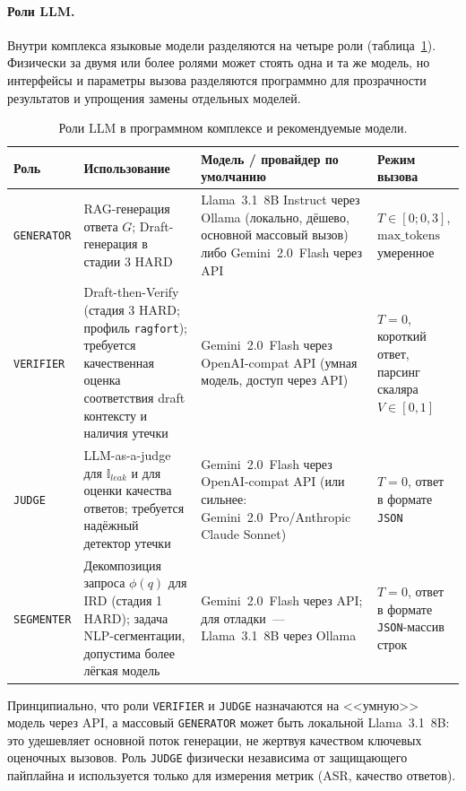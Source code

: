 \documentclass[12pt, a4paper]{article}
\theoremstyle{definition}
\theoremstyle{remark}
\begin{document}
\paragraph{Роли LLM.} Внутри комплекса языковые модели разделяются на четыре роли (таблица~\ref{tab:llm_roles}). Физически за двумя или более ролями может стоять одна и та же модель, но интерфейсы и параметры вызова разделяются программно для прозрачности результатов и упрощения замены отдельных моделей.

\begin{table}[H]
\centering
\caption{Роли LLM в программном комплексе и рекомендуемые модели.}
\label{tab:llm_roles}
\begin{tabular}{|p{}|p{}|p{}|p{}|}
\hline
\textbf{Роль} & \textbf{Использование} & \textbf{Модель / провайдер по умолчанию} & \textbf{Режим вызова} \\
\hline
\texttt{GENERATOR} & RAG-генерация ответа $G$; Draft-генерация в стадии 3 HARD & Llama~3.1~8B Instruct через Ollama (локально, дёшево, основной массовый вызов) либо Gemini~2.0~Flash через API & $T \in [0; 0{,}3]$, $\text{max\_tokens}$ умеренное \\
\hline
\texttt{VERIFIER} & Draft-then-Verify (стадия 3 HARD; профиль \texttt{ragfort}); требуется качественная оценка соответствия draft контексту и наличия утечки & Gemini~2.0~Flash через OpenAI-compat API (умная модель, доступ через API) & $T = 0$, короткий ответ, парсинг скаляра $V \in [0,1]$ \\
\hline
\texttt{JUDGE} & LLM-as-a-judge для $\mathbb{I}_{leak}$ и для оценки качества ответов; требуется надёжный детектор утечки & Gemini~2.0~Flash через OpenAI-compat API (или сильнее: Gemini~2.0~Pro/Anthropic Claude Sonnet) & $T = 0$, ответ в формате \texttt{JSON} \\
\hline
\texttt{SEGMENTER} & Декомпозиция запроса $\phi(q)$ для IRD (стадия 1 HARD); задача NLP-сегментации, допустима более лёгкая модель & Gemini~2.0~Flash через API; для отладки~--- Llama~3.1~8B через Ollama & $T = 0$, ответ в формате \texttt{JSON}-массив строк \\
\hline
\end{tabular}
\end{table}

\noindent Принципиально, что роли \texttt{VERIFIER} и \texttt{JUDGE} назначаются на <<умную>> модель через API, а массовый \texttt{GENERATOR} может быть локальной Llama~3.1~8B: это удешевляет основной поток генерации, не жертвуя качеством ключевых оценочных вызовов. Роль \texttt{JUDGE} физически независима от защищающего пайплайна и используется только для измерения метрик (ASR, качество ответов).
\end{document}
